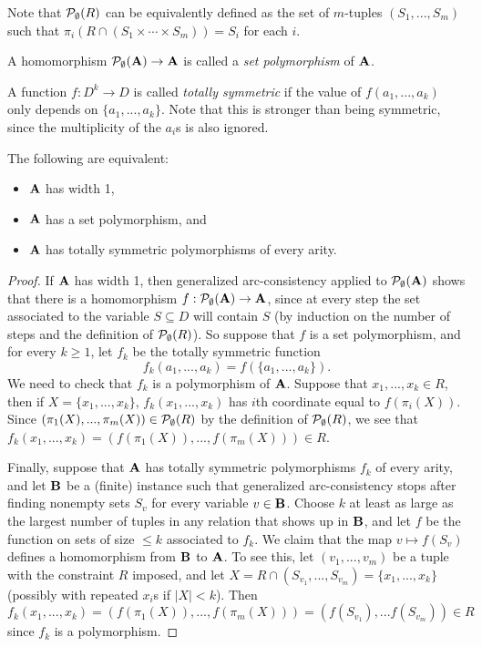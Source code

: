 \documentclass[letterpaper,11pt]{article}
\begin{document}
Note that $\mathcal{P}_\emptyset(R)$ can be equivalently defined as the set of $m$-tuples $(S_1, ..., S_m)$ such that $\pi_i(R \cap (S_1 \times \cdots \times S_m)) = S_i$ for each $i$.

\begin{defn} A homomorphism $\mathcal{P}_\emptyset(\mathbf{A}) \rightarrow \mathbf{A}$ is called a \emph{set polymorphism} of $\mathbf{A}$.
\end{defn}

\begin{defn} A function $f : D^k \rightarrow D$ is called \emph{totally symmetric} if the value of $f(a_1, ..., a_k)$ only depends on $\{a_1, ..., a_k\}$. Note that this is stronger than being symmetric, since the multiplicity of the $a_i$s is also ignored.
\end{defn}

\begin{thm} The following are equivalent:
\begin{itemize}
\item $\mathbf{A}$ has width 1,

\item $\mathbf{A}$ has a set polymorphism, and

\item $\mathbf{A}$ has totally symmetric polymorphisms of every arity.
\end{itemize}
\end{thm}
\begin{proof} If $\mathbf{A}$ has width 1, then generalized arc-consistency applied to $\mathcal{P}_\emptyset(\mathbf{A})$ shows that there is a homomorphism $f: \mathcal{P}_\emptyset(\mathbf{A}) \rightarrow \mathbf{A}$, since at every step the set associated to the variable $S \subseteq D$ will contain $S$ (by induction on the number of steps and the definition of $\mathcal{P}_\emptyset(R)$). So suppose that $f$ is a set polymorphism, and for every $k \ge 1$, let $f_k$ be the totally symmetric function
\[
f_k(a_1, ..., a_k) = f(\{a_1, ..., a_k\}).
\]
We need to check that $f_k$ is a polymorphism of $\mathbf{A}$. Suppose that $x_1, ..., x_k \in R$, then if $X = \{x_1, ..., x_k\}$, $f_k(x_1, ..., x_k)$ has $i$th coordinate equal to $f(\pi_i(X))$. Since $(\pi_1(X), ..., \pi_m(X)) \in \mathcal{P}_\emptyset(R)$ by the definition of $\mathcal{P}_\emptyset(R)$, we see that $f_k(x_1, ..., x_k) = (f(\pi_1(X)), ..., f(\pi_m(X))) \in R$.

Finally, suppose that $\mathbf{A}$ has totally symmetric polymorphisms $f_k$ of every arity, and let $\mathbf{B}$ be a (finite) instance such that generalized arc-consistency stops after finding nonempty sets $S_v$ for every variable $v \in \mathbf{B}$. Choose $k$ at least as large as the largest number of tuples in any relation that shows up in $\mathbf{B}$, and let $f$ be the function on sets of size $\le k$ associated to $f_k$. We claim that the map $v \mapsto f(S_v)$ defines a homomorphism from $\mathbf{B}$ to $\mathbf{A}$. To see this, let $(v_1, ..., v_m)$ be a tuple with the constraint $R$ imposed, and let $X = R \cap (S_{v_1}, ..., S_{v_m}) = \{x_1, ..., x_k\}$ (possibly with repeated $x_i$s if $|X| < k$). Then $f_k(x_1, ..., x_k) = (f(\pi_1(X)), ..., f(\pi_m(X))) = (f(S_{v_1}), ... f(S_{v_m})) \in R$ since $f_k$ is a polymorphism.
\end{proof}
\end{document}

